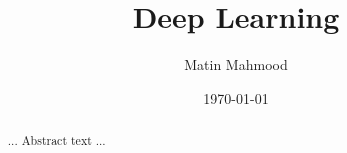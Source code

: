 \documentclass[12pt,oneside]{report}
\title{Deep Learning}
\date{\today}
\author{Matin Mahmood}
\begin{document}
 \maketitle

 \begin{abstract} ... Abstract text ... \end{abstract}
 \declaration
 \dedication{This paper is dedicated to Greyfriars Bobby}

 \tableofcontents
 \newpage


 


\end{document}
